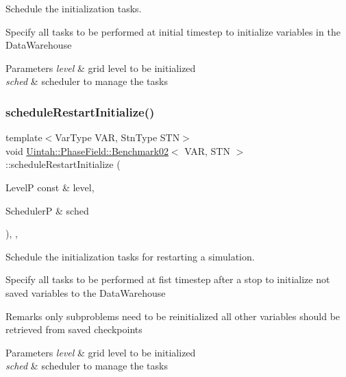 Schedule the initialization tasks. 

Specify all tasks to be performed at initial timestep to initialize variables in the Data\+Warehouse


\begin{DoxyParams}{Parameters}
{\em level} & grid level to be initialized \\
\hline
{\em sched} & scheduler to manage the tasks \\
\hline
\end{DoxyParams}
\mbox{\label{classUintah_1_1PhaseField_1_1Benchmark02_a45e3fbf539b671cc483f633fe631f552}} 
\subsubsection{\texorpdfstring{schedule\+Restart\+Initialize()}{scheduleRestartInitialize()}}
{\footnotesize\ttfamily template$<$Var\+Type V\+AR, Stn\+Type S\+TN$>$ \\
void \hyperlink{classUintah_1_1PhaseField_1_1Benchmark02}{Uintah\+::\+Phase\+Field\+::\+Benchmark02}$<$ V\+AR, S\+TN $>$\+::schedule\+Restart\+Initialize (\begin{DoxyParamCaption}\item[{LevelP const \&}]{level,  }\item[{SchedulerP \&}]{sched }\end{DoxyParamCaption})\hspace{0.3cm}{\ttfamily [override]}, {\ttfamily [protected]}, {\ttfamily [virtual]}}



Schedule the initialization tasks for restarting a simulation. 

Specify all tasks to be performed at fist timestep after a stop to initialize not saved variables to the Data\+Warehouse

\begin{DoxyRemark}{Remarks}
only subproblems need to be reinitialized all other variables should be retrieved from saved checkpoints
\end{DoxyRemark}

\begin{DoxyParams}{Parameters}
{\em level} & grid level to be initialized \\
\hline
{\em sched} & scheduler to manage the tasks \\
\hline
\end{DoxyParams}
\mbox{\label{classUintah_1_1PhaseField_1_1Benchmark02_a17d3ffefcc77148251dd189d5bf4e9e2}} 
